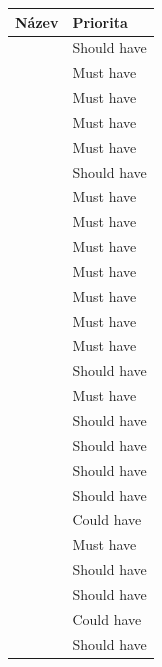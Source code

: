 \begin{table}[!ht]
    \centering
    \begin{tabular}{@{} l l @{}}
        \toprule
        Název & Priorita \\
        \midrule
        \nameref{sec:fp-welcome-page} & Should have \\
        \nameref{sec:fp-onboarding} & Must have \\
        \nameref{sec:fp-course-browse} & Must have \\
        \nameref{sec:fp-course-page} & Must have \\
        \nameref{sec:fp-course-chapter-page} & Must have \\
        \nameref{sec:fp-course-certificate} & Should have \\
        \nameref{sec:fp-learning-paths} & Must have \\
        \nameref{sec:fp-course-management} & Must have \\
        \nameref{sec:fp-study-plan} & Must have \\
        \nameref{sec:fp-study-plan-learning} & Must have \\
        \nameref{sec:fp-post-lesson-review} & Must have \\
        \nameref{sec:fp-learning-structure} & Must have \\
        \nameref{sec:fp-exercise-blocks} & Must have \\
        \nameref{sec:fp-code-editor} & Should have \\
        \nameref{sec:fp-explanation-blocks} & Must have \\
        \nameref{sec:fp-answer-explanation} & Should have \\
        \nameref{sec:fp-report-learning-issue} & Should have \\
        \nameref{sec:fp-learning-stats} & Should have \\
        \nameref{sec:fp-energy-status} & Should have \\
        \nameref{sec:fp-google-auth} & Could have \\
        \nameref{sec:fp-settings-page} & Must have \\
        \nameref{sec:fp-dark-mode} & Should have \\
        \nameref{sec:fp-push-notifications} & Should have \\
        \nameref{sec:fp-learning-reminder} & Could have \\
        \nameref{sec:fp-advertisement} & Should have \\

\end{tabular}
\end{table}
